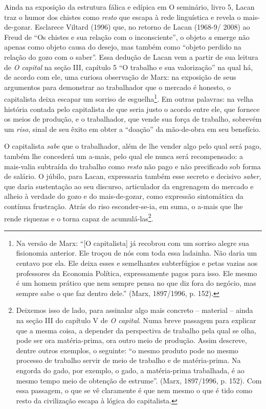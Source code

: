 Ainda na exposição da estrutura fálica e edípica em O seminário, livro
5, Lacan traz o humor dos chistes como \emph{resto} que escapa à rede
linguística e revela o mais-de-gozar. Esclarece Viltard (1996) que, no
retorno de Lacan (1968-9/ 2008) ao Freud de ``Os chistes e sua relação
com o inconsciente'', o objeto \emph{a} emerge não apenas como objeto
causa do desejo, mas também como ``objeto perdido na relação do gozo com
o saber''. Essa dedução de Lacan vem a partir de sua leitura de \emph{O
capital} na seção III, capítulo 5 ``O trabalho e sua valorização'' na
qual há, de acordo com ele, uma curiosa observação de Marx: na exposição
de seus argumentos para demonstrar ao trabalhador que o mercado é
honesto, o capitalista deixa escapar um sorriso de esguelha\footnote{Na
  versão de Marx: ``{[}O capitalista{]} já recobrou com um sorriso
  alegre sua fisionomia anterior. Ele troçou de nós com toda essa
  ladainha. Não daria um centavo por ela. Ele deixa esses e semelhantes
  subterfúgios e petas vazias aos professores da Economia Política,
  expressamente pagos para isso. Ele mesmo é um homem prático que nem
  sempre pensa no que diz fora do negócio, mas sempre sabe o que faz
  dentro dele.'' (Marx, 1897/1996, p. 152).}. Em outras palavras: na
velha história contada pelo capitalista de que seria justo o acordo
entre ele, que fornece os meios de produção, e o trabalhador, que vende
sua força de trabalho, sobrevém um \emph{riso}, sinal de seu êxito em
obter a ``doação'' da mão-de-obra em seu benefício.

O capitalista \emph{sabe} que o trabalhador, além de lhe vender algo
pelo qual será pago, também lhe concederá um a-mais, pelo qual ele nunca
será recompensado: a mais-valia subtraída do trabalho como \emph{resto}
não pago e não precificado sob forma de salário. O júbilo, para Lacan,
expressaria também esse secreto e decisivo \emph{saber}, que daria
sustentação ao seu discurso, articulador da engrenagem do mercado e
alheio à verdade do gozo e do mais-de-gozar, como expressão sintomática
da contínua frustração. Atrás do riso esconder-se-ia, em suma, o a-mais
que lhe rende riquezas e o torna capaz de acumulá-las\footnote{Deixemos
  isso de lado, para assinalar algo mais concreto -- material -- ainda
  na seção III do capítulo V de \emph{O capital}. Numa breve passagem
  para explicar que a mesma coisa, a depender da perspectiva de trabalho
  pela qual se olha, pode ser ora matéria-prima, ora outro meio de
  produção. Assim descreve, dentre outros exemplos, o seguinte: ``o
  mesmo produto pode no mesmo processo de trabalho servir de meio de
  trabalho e de matéria-prima. Na engorda do gado, por exemplo, o gado,
  a matéria-prima trabalhada, é ao mesmo tempo meio de obtenção de
  estrume''. (Marx, 1897/1996, p. 152). Com essa passagem, o que se vê
  claramente é que nem mesmo o que é tido como resto da civilização
  escapa à lógica do capitalista.}.

